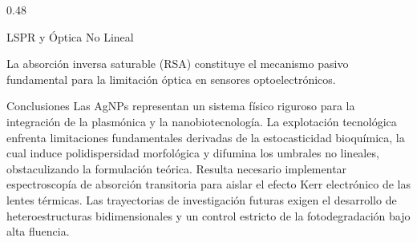 \documentclass[final]{beamer}
\begin{document}
\begin{frame}[t]
\begin{columns}[t]
\begin{column}{0.48\textwidth}
\begin{block}{LSPR y Óptica No Lineal}
        \vspace{1cm}
        \begin{figure}[htbp!]
          \centering
        \end{figure}
        \vspace{0.5cm}

        La absorción inversa saturable (RSA) constituye el mecanismo pasivo
        fundamental para la limitación óptica en sensores optoelectrónicos.
      \end{block}

      \begin{alertblock}{Conclusiones}
        Las AgNPs representan un sistema físico riguroso para la integración de
        la plasmónica y la nanobiotecnología. La explotación tecnológica
        enfrenta limitaciones fundamentales derivadas de la estocasticidad
        bioquímica, la cual induce polidispersidad morfológica y difumina los
        umbrales no lineales, obstaculizando la formulación teórica. Resulta
        necesario implementar espectroscopía de absorción transitoria para
        aislar el efecto Kerr electrónico de las lentes térmicas. Las
        trayectorias de investigación futuras exigen el desarrollo de
        heteroestructuras bidimensionales y un control estricto de la
        fotodegradación bajo alta fluencia.
      \end{alertblock}
    \end{column}
  \end{columns}
\end{frame}
\end{document}
